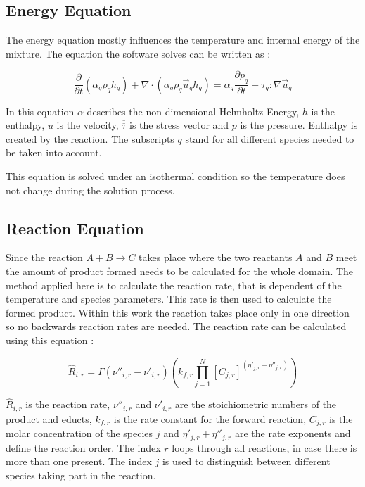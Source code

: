\documentclass[../thesis.tex]{subfiles}
\begin{document}
\subsection{Energy Equation}

The energy equation mostly influences the temperature and internal energy of the mixture. The equation the software solves can be written as \cite{manual2009ansys}:

\begin{equation} 
\frac{\partial}{\partial t} (\alpha_q \rho_q h_q ) + \nabla \cdot (\alpha_q \rho_q \vec u_q h_q )   = \alpha_q \frac{\partial p_q}{\partial t} + \overline{\overline{\tau}}_q : \nabla \vec u_q
\end{equation}

In this equation $\alpha$ describes the non-dimensional Helmholtz-Energy, $h$ is the enthalpy, $u$ is the velocity, $\overline{\overline{\tau}}$ is the stress vector and $p$ is the pressure. Enthalpy is created by the reaction. The subscripts $q$ stand for all different species needed to be taken into account.

This equation is solved under an isothermal condition so the temperature does not change during the solution process. 

\subsection{Reaction Equation}
\label{sec: reaction_eqn}

Since the reaction $ A + B \rightarrow C$ takes place where the two reactants $A$ and $B$ meet the amount of product formed needs to be calculated for the whole domain. The method applied here is to calculate the reaction rate, that is dependent of the temperature and species parameters. This rate is then used to calculate the formed product. Within this work the reaction takes place only in one direction so no backwards reaction rates are needed. The reaction rate can be calculated using this equation \cite{manual2009ansys}:

\begin{equation}
\label{eqn:reaction}
\hat{R}_{i,r} = {\Gamma} \left(\nu''_{i,r} - \nu'_{i,r} \right) \left(k_{f,r} \prod_{j=1}^{N} \left[C_{j,r} \right]^{(\eta'_{j,r} + \eta''_{j,r})} \right) 
\end{equation}

$\hat{R}_{i,r}$ is the reaction rate, $\nu''_{i,r}$ and $\nu'_{i,r}$ are the stoichiometric numbers of the product and educts, $k_{f,r}$ is the rate constant for the forward reaction, $C_{j,r}$ is the molar concentration of the species $j$ and $\eta'_{j,r} + \eta''_{j,r}$ are the rate exponents and define the reaction order. 
The index $r$ loops through all reactions, in case there is more than one present. The index $j$ is used to distinguish between different species taking part in the reaction.
\end{document}
